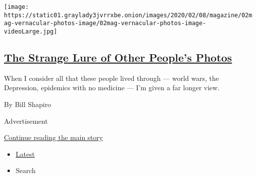 \begin{enumerate}
  \texttt{[image: https://static01.graylady3jvrrxbe.onion/images/2020/02/08/magazine/02mag-vernacular-photos-image/02mag-vernacular-photos-image-videoLarge.jpg]}

  \hypertarget{the-strange-lure-of-other-peoples-photos}{%
  \subsection{\texorpdfstring{\href{/2020/07/30/magazine/the-strange-lure-of-other-peoples-photos.html}{The
  Strange Lure of Other People's
  Photos}}{The Strange Lure of Other People's Photos}}\label{the-strange-lure-of-other-peoples-photos}}

  When I consider all that these people lived through --- world wars,
  the Depression, epidemics with no medicine --- I'm given a far longer
  view.

  By Bill Shapiro
\end{enumerate}

Advertisement

\protect\hyperlink{after-mid1}{Continue reading the main story}

\begin{itemize}
\tightlist
\item
  \protect\hyperlink{stream-panel}{Latest}
\item
  Search
\end{itemize}


